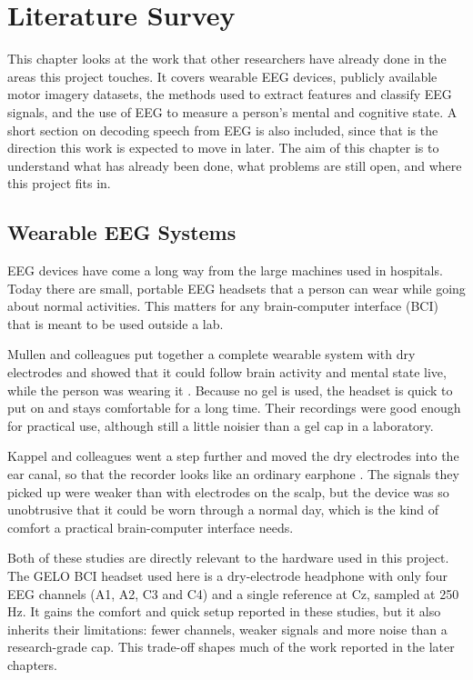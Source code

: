 \chapter{Literature Survey}

This chapter looks at the work that other researchers have already done in the areas this
project touches. It covers wearable EEG devices, publicly available motor imagery
datasets, the methods used to extract features and classify EEG signals, and the use of
EEG to measure a person's mental and cognitive state. A short section on decoding speech
from EEG is also included, since that is the direction this work is expected to move in
later. The aim of this chapter is to understand what has already been done, what problems
are still open, and where this project fits in.

\section{Wearable EEG Systems}

EEG devices have come a long way from the large machines used in hospitals. Today there
are small, portable EEG headsets that a person can wear while going about normal
activities. This matters for any brain-computer interface (BCI) that is meant to be used
outside a lab.

Mullen and colleagues put together a complete wearable system with dry electrodes and
showed that it could follow brain activity and mental state live, while the person was
wearing it \cite{mullen2015wearable}. Because no gel is used, the headset is quick to put
on and stays comfortable for a long time. Their recordings were good enough for practical
use, although still a little noisier than a gel cap in a laboratory.

Kappel and colleagues went a step further and moved the dry electrodes into the ear
canal, so that the recorder looks like an ordinary earphone \cite{kappel2019earEEG}. The
signals they picked up were weaker than with electrodes on the scalp, but the device was
so unobtrusive that it could be worn through a normal day, which is the kind of comfort a
practical brain-computer interface needs.

Both of these studies are directly relevant to the hardware used in this project. The GELO
BCI headset used here is a dry-electrode headphone with only four EEG channels (A1, A2, C3
and C4) and a single reference at Cz, sampled at 250 Hz. It gains the comfort and quick
setup reported in these studies, but it also inherits their limitations: fewer channels,
weaker signals and more noise than a research-grade cap. This trade-off shapes much of the
work reported in the later chapters.

